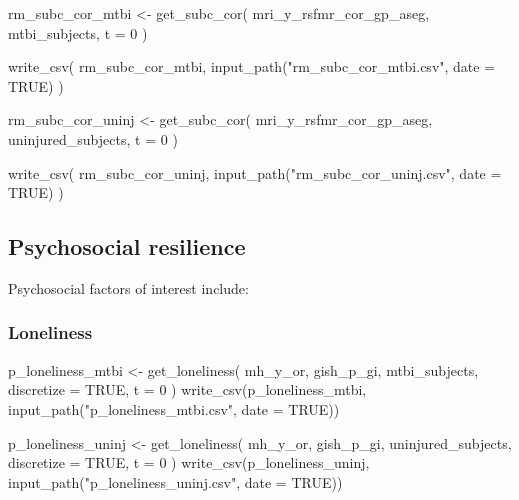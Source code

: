 \documentclass[
  letterpaper,
  DIV=11,
  numbers=noendperiod]{scrreprt}
\newenvironment{Shaded}{\begin{snugshade}}{\end{snugshade}}
\newcommand{\AttributeTok}[1]{\textcolor[rgb]{0.40,0.45,0.13}{#1}}
\newcommand{\ConstantTok}[1]{\textcolor[rgb]{0.56,0.35,0.01}{#1}}
\newcommand{\DecValTok}[1]{\textcolor[rgb]{0.68,0.00,0.00}{#1}}
\newcommand{\FunctionTok}[1]{\textcolor[rgb]{0.28,0.35,0.67}{#1}}
\newcommand{\NormalTok}[1]{\textcolor[rgb]{0.00,0.23,0.31}{#1}}
\newcommand{\OtherTok}[1]{\textcolor[rgb]{0.00,0.23,0.31}{#1}}
\newcommand{\StringTok}[1]{\textcolor[rgb]{0.13,0.47,0.30}{#1}}
\begin{document}
\begin{Shaded}
\begin{Highlighting}[]
\NormalTok{rm\_subc\_cor\_mtbi }\OtherTok{\textless{}{-}} \FunctionTok{get\_subc\_cor}\NormalTok{(}
\NormalTok{    mri\_y\_rsfmr\_cor\_gp\_aseg,}
\NormalTok{    mtbi\_subjects,}
    \AttributeTok{t =} \DecValTok{0}
\NormalTok{)}

\FunctionTok{write\_csv}\NormalTok{(}
\NormalTok{    rm\_subc\_cor\_mtbi, }\FunctionTok{input\_path}\NormalTok{(}\StringTok{"rm\_subc\_cor\_mtbi.csv"}\NormalTok{, }\AttributeTok{date =} \ConstantTok{TRUE}\NormalTok{)}
\NormalTok{)}

\NormalTok{rm\_subc\_cor\_uninj }\OtherTok{\textless{}{-}} \FunctionTok{get\_subc\_cor}\NormalTok{(}
\NormalTok{    mri\_y\_rsfmr\_cor\_gp\_aseg,}
\NormalTok{    uninjured\_subjects,}
    \AttributeTok{t =} \DecValTok{0}
\NormalTok{)}

\FunctionTok{write\_csv}\NormalTok{(}
\NormalTok{    rm\_subc\_cor\_uninj, }\FunctionTok{input\_path}\NormalTok{(}\StringTok{"rm\_subc\_cor\_uninj.csv"}\NormalTok{, }\AttributeTok{date =} \ConstantTok{TRUE}\NormalTok{)}
\NormalTok{)}
\end{Highlighting}
\end{Shaded}

\subsection{Psychosocial resilience}\label{psychosocial-resilience}

Psychosocial factors of interest include:

\subsubsection{Loneliness}\label{loneliness}

\begin{Shaded}
\begin{Highlighting}[]
\NormalTok{p\_loneliness\_mtbi }\OtherTok{\textless{}{-}} \FunctionTok{get\_loneliness}\NormalTok{(}
\NormalTok{    mh\_y\_or,}
\NormalTok{    gish\_p\_gi,}
\NormalTok{    mtbi\_subjects,}
    \AttributeTok{discretize =} \ConstantTok{TRUE}\NormalTok{,}
    \AttributeTok{t =} \DecValTok{0}
\NormalTok{)}
\FunctionTok{write\_csv}\NormalTok{(p\_loneliness\_mtbi, }\FunctionTok{input\_path}\NormalTok{(}\StringTok{"p\_loneliness\_mtbi.csv"}\NormalTok{, }\AttributeTok{date =} \ConstantTok{TRUE}\NormalTok{))}

\NormalTok{p\_loneliness\_uninj }\OtherTok{\textless{}{-}} \FunctionTok{get\_loneliness}\NormalTok{(}
\NormalTok{    mh\_y\_or,}
\NormalTok{    gish\_p\_gi,}
\NormalTok{    uninjured\_subjects,}
    \AttributeTok{discretize =} \ConstantTok{TRUE}\NormalTok{,}
    \AttributeTok{t =} \DecValTok{0}
\NormalTok{)}
\FunctionTok{write\_csv}\NormalTok{(p\_loneliness\_uninj, }\FunctionTok{input\_path}\NormalTok{(}\StringTok{"p\_loneliness\_uninj.csv"}\NormalTok{, }\AttributeTok{date =} \ConstantTok{TRUE}\NormalTok{))}
\end{Highlighting}
\end{Shaded}
\end{document}
